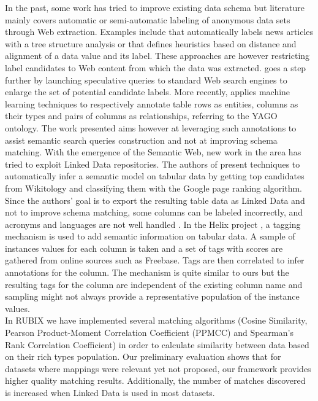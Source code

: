 \documentclass[onecolumn, crcready]{iosart2c}
\begin{document}
In the past, some work has tried to improve existing data schema \cite{DBLP:journals/debu/MillerA03} but literature mainly covers automatic or semi-automatic labeling of anonymous data sets through Web extraction. Examples include \cite{cas04} that automatically labels news articles with a tree structure analysis or \cite{wang2003extraction} that defines heuristics based on distance and alignment of a data value and its label. These approaches are however restricting label candidates to Web content from which the data was extracted. \cite{DBLP:conf/otm/SilvaBCS07} goes a step further by launching speculative queries to standard Web search engines to enlarge the set of potential candidate labels. More recently, \cite{Limaye:2010:ASW:1920841.1921005} applies machine learning techniques to respectively annotate table rows as entities, columns as their types and pairs of columns as relationships, referring to the YAGO ontology. The work presented aims however at leveraging such annotations to assist semantic search queries construction and not at improving schema matching. 
With the emergence of the Semantic Web, new work in the area has tried to exploit Linked Data repositories. The authors of \cite{Syed2010Tables} present techniques to automatically infer a semantic model on tabular data by getting top candidates from Wikitology \cite{conf/aaaiss/FininSMMP09} and classifying them with the Google page ranking algorithm. Since the authors' goal is to export the resulting table data as Linked Data and not to improve schema matching, some columns can be labeled incorrectly, and acronyms and languages are not well handled \cite{Syed2010Tables}. In the Helix project \cite{conf/www/HassanzadehDFKSW11}, a tagging mechanism is used to add semantic information on tabular data. A sample of instances values for each column is taken and a set of tags with scores are gathered from online sources such as Freebase. Tags are then correlated to infer annotations for the column. The mechanism is quite similar to ours but the resulting tags for the column are independent of the existing column name and sampling might not always provide a representative population of the instance values.\\

In RUBIX we have implemented several matching algorithms (Cosine Similarity, Pearson Product-Moment Correlation Coefficient (PPMCC) and Spearman's Rank Correlation Coefficient) in order to calculate similarity between data based on their rich types population. Our preliminary evaluation shows that for datasets where mappings were relevant yet not proposed, our framework provides higher quality matching results. Additionally, the number of matches discovered is increased when Linked Data is used in most datasets. 
\end{document}
